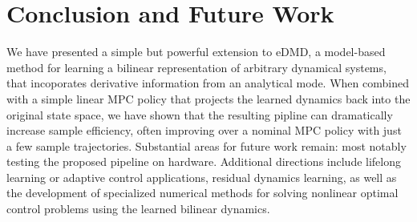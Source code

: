\documentclass{article}
\begin{document}
\section{Conclusion and Future Work} \label{sec:conclusion}
We have presented a simple but powerful extension to eDMD, a model-based method for learning
a bilinear representation of arbitrary dynamical systems, that incoporates derivative 
information from an analytical mode. When combined with a simple linear
MPC policy that projects the learned dynamics back into the original state space, we have 
shown that the resulting pipline can dramatically increase sample efficiency, often 
improving over a nominal MPC policy with just a few sample trajectories. Substantial areas 
for future work remain: most notably testing the proposed pipeline on hardware. Additional 
directions include lifelong learning or adaptive control applications, residual dynamics 
learning, as well as the development of specialized numerical methods for solving nonlinear 
optimal control problems using the learned bilinear dynamics.


\end{document}
